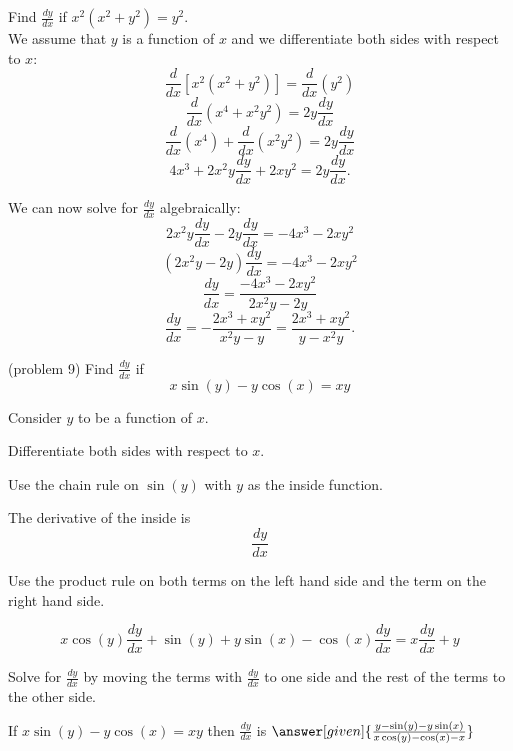 \documentclass{ximera}
\begin{document}
\begin{example}[example 9]
Find  $\frac{dy}{dx}$ if $x^2(x^2 + y^2) =y^2$.\\
We assume that $y$ is a function of $x$ and we differentiate both 
sides with respect to $x$:
\[\frac{d}{dx}[x^2(x^2 + y^2)]  = \frac{d}{dx} (y^2 )\]
\[\frac{d}{dx}(x^4 + x^2y^2) = 2y\frac{dy}{dx}\]
\[\frac{d}{dx}(x^4) + \frac{d}{dx}(x^2y^2)  = 2y\frac{dy}{dx}\]
\[4x^3 + 2x^2y\frac{dy}{dx} + 2xy^2  = 2y\frac{dy}{dx}.\]

We can now solve for $\displaystyle{\frac{dy}{dx}}$ algebraically:
\[2x^2y\frac{dy}{dx} - 2y\frac{dy}{dx}= -4x^3 - 2xy^2\]
\[(2x^2y- 2y)\frac{dy}{dx}= -4x^3 - 2xy^2\]
\[\frac{dy}{dx}= \frac{-4x^3 - 2xy^2}{2x^2y- 2y}\]
\[\frac{dy}{dx}= -\frac{2x^3 + xy^2}{x^2y- y}= 
\frac{2x^3 + xy^2}{y - x^2y}.\]
\end{example}


\begin{center}
\begin{foldable}
\end{foldable}
\end{center}



\begin{problem}(problem 9)
  Find $\frac{dy}{dx}$ if
  \[
  x\sin(y) - y\cos(x) = xy
  \]
  
	  
    \begin{hint}
      Consider $y$ to be a function of $x$.
    \end{hint}
		\begin{hint}
		  Differentiate both sides with respect to $x$.
		\end{hint}
    \begin{hint}
      Use the chain rule on $\sin(y)$ with $y$ as the inside function.
    \end{hint}
    \begin{hint}
      The derivative of the inside is 
      \[
      \frac{dy}{dx}
      \]
    \end{hint}
		\begin{hint}
      Use the product rule on both terms on the left hand side and the term on the right hand side.
    \end{hint}
		\begin{hint}
		  \[
			x\cos(y)\frac{dy}{dx} + \sin(y) + y\sin(x) - \cos(x)\frac{dy}{dx} = 
			x\frac{dy}{dx} + y
			\]
		\end{hint}
		\begin{hint}
		  Solve for $\frac{dy}{dx}$ by moving the terms with $\frac{dy}{dx}$ to one side and the 
			rest of the terms to the other side.
		\end{hint}
    
		If $x\sin(y) - y\cos(x) = xy$ then $\frac{dy}{dx}$ is
		 $\answer[given]{\frac{y - \sin(y) - y\sin(x)}{x\cos(y) -\cos(x) -x}}$
		
\end{problem}
\end{document}
